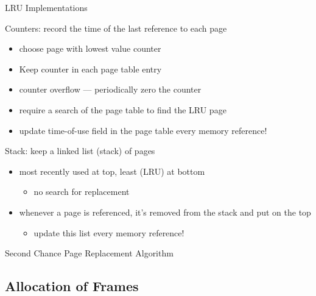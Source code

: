 \begin{frame}{LRU Implementations}
  \begin{block}{\alert{Counters}: record the time of the last reference
      to each page}
    \begin{itemize}
    \item choose page with lowest value counter
    \item Keep counter in each page table entry
    \item counter overflow --- periodically zero the counter
    \item require a \alert{search} of the page table to find the LRU page
    \item update time-of-use field in the page table \alert{every memory reference!}
    \end{itemize}
  \end{block}
  \begin{block}{\alert{Stack}: keep a linked list (stack) of pages}
    \begin{itemize}
    \item most recently used at top, least (LRU) at bottom
      \begin{itemize}
      \item no search for replacement
      \end{itemize}
    \item whenever a page is referenced, it's removed from the stack and put on the top
      \begin{itemize}
      \item update this list \alert{every memory reference!}
      \end{itemize}
    \end{itemize}
  \end{block}
\end{frame}

\begin{frame}{Second Chance Page Replacement Algorithm}
  \begin{center}
  \end{center}
\end{frame}

\subsection{Allocation of Frames}

